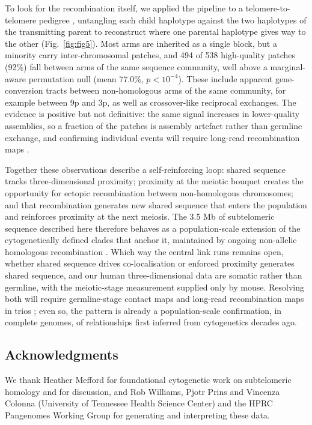 \documentclass[pdflatex,mathphys]{jnl}
\begin{document}
To look for the recombination itself, we applied the pipeline to a
telomere-to-telomere pedigree \cite{Cechova2025}, untangling each child
haplotype against the two haplotypes of the transmitting parent to reconstruct
where one parental haplotype gives way to the other (Fig.~\ref{fig:fig5}).
Most arms are inherited as a single block, but a minority carry inter-chromosomal
patches, and 494 of 538 high-quality patches (92\%) fall between arms of the
same sequence community, well above a marginal-aware permutation null (mean
77.0\%, $p < 10^{-4}$).
These include apparent gene-conversion tracts between non-homologous arms of the
same community, for example between 9p and 3p, as well as crossover-like
reciprocal exchanges.
The evidence is positive but not definitive: the same signal increases in
lower-quality assemblies, so a fraction of the patches is assembly artefact
rather than germline exchange, and confirming individual events will require
long-read recombination maps \cite{Halldorsson2019,palsson2025recomb}.

Together these observations describe a self-reinforcing loop: shared sequence
tracks three-dimensional proximity; proximity at the meiotic bouquet creates the
opportunity for ectopic recombination between non-homologous chromosomes; and
that recombination generates new shared sequence that enters the population and
reinforces proximity at the next meiosis.
The 3.5 Mb of subtelomeric sequence described here therefore behaves as a
population-scale extension of the cytogenetically defined clades that anchor it,
maintained by ongoing non-allelic homologous recombination
\cite{Dover1982,concerted_evolution_nahr_Hastings2009}.
Which way the central link runs remains open, whether shared sequence drives
co-localisation or enforced proximity generates shared sequence, and our human
three-dimensional data are somatic rather than germline, with the meiotic-stage
measurement supplied only by mouse.
Resolving both will require germline-stage contact maps and long-read
recombination maps in trios \cite{palsson2025recomb,Logsdon2024}; even so, the
pattern is already a population-scale confirmation, in complete genomes, of
relationships first inferred from cytogenetics decades ago.

\subsection*{Acknowledgments}

We thank Heather Mefford for foundational cytogenetic work on subtelomeric
homology and for discussion, and Rob Williams, Pjotr Prins and Vincenza Colonna
(University of Tennessee Health Science Center) and the HPRC Pangenomes Working
Group for generating and interpreting these data.
\end{document}
